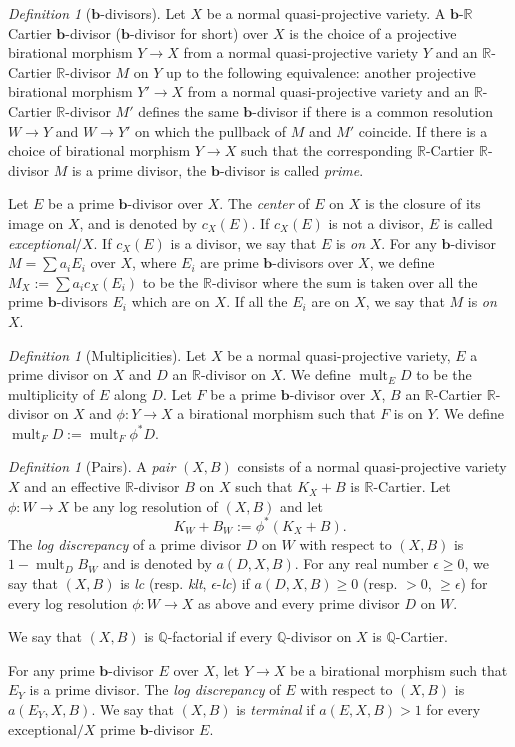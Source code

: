 \documentclass[11pt]{amsart}
\numberwithin{equation}{section}
\newcommand{\bb}{\bm{b}}
\newcommand{\Qq}{\mathbb{Q}}
\newcommand{\Rr}{\mathbb{R}}
\newcommand{\mult}{\operatorname{mult}}
\theoremstyle{definition}
\theoremstyle{remark}
\newtheorem{defn}[thm]{Definition}
\theoremstyle{definition}
\begin{document}
\begin{defn}[$\bb$-divisors] Let $X$ be a normal quasi-projective variety. A $\bb$-$\Rr$ Cartier $\bb$-divisor ($\bb$-divisor for short) over $X$ is the choice of a projective birational morphism $Y\to X$ from a normal quasi-projective variety $Y$ and an $\Rr$-Cartier $\mathbb R$-divisor $M$ on $Y$ up to the following equivalence: another projective birational morphism $Y'\to X$ from a normal quasi-projective variety and an $\Rr$-Cartier $\Rr$-divisor $M'$ defines the same $\bb$-divisor if there is a common resolution $W\to Y$ and $W\to Y'$ on which the pullback of $M$ and $M'$ coincide. If there is a choice of birational morphism $Y\rightarrow X$ such that the corresponding $\Rr$-Cartier $\Rr$-divisor $M$ is a prime divisor, the $\bb$-divisor is called \emph{prime}.

	Let $E$ be a prime $\bb$-divisor over $X$. The \emph{center} of $E$ on $X$ is the closure of its image on $X$, and is denoted by $c_X(E)$. If $c_X(E)$ is not a divisor, $E$ is called \emph{exceptional}$/X$. If $c_X(E)$ is a divisor, we say that $E$ is \emph{on} $X$. For any $\bb$-divisor $M=\sum a_iE_i$ over $X$, where $E_i$ are prime $\bb$-divisors over $X$, we define $M_X:=\sum a_ic_X(E_i)$ to be the $\Rr$-divisor where the sum is taken over all the prime $\bb$-divisors $E_i$ which are on $X$. If all the $E_i$ are on $X$, we say that $M$ is \emph{on} $X$. 
\end{defn}

\begin{defn}[Multiplicities] Let $X$ be a normal quasi-projective variety, $E$ a prime divisor on $X$ and $D$ an $\Rr$-divisor on $X$. We define $\mult_ED$ to be the multiplicity of $E$ along $D$. 
Let $F$ be a prime $\bb$-divisor over $X$, $B$ an $\Rr$-Cartier $\Rr$-divisor on $X$ and $\phi: Y\to X$ a birational morphism such that $F$ is on $Y$. We define $\mult_FD:=\mult_F\phi^*D$.
\end{defn}

\begin{defn}[Pairs]\label{defn: positivity}
	A \emph{pair} $(X,B)$ consists of a normal quasi-projective variety $X$ and an effective $\Rr$-divisor $B$ on $X$ such that $K_X+B$ is $\Rr$-Cartier.
	Let $\phi:W\to X$
	be any log resolution of $(X,B)$ and let
	$$K_W+B_W:=\phi^{*}(K_X+B).$$
	The \emph{log discrepancy} of a prime divisor $D$ on $W$ with respect to $(X,B)$ is $1-\mult_{D}B_W$ and is denoted by $a(D,X,B).$
	For any real number $\epsilon\geq 0$, we say that $(X,B)$ is \emph{lc} (resp. \emph{klt}, $\epsilon$-\emph{lc}) if $a(D,X,B)\ge0$ (resp. $>0$, $\ge\epsilon$) for every log resolution $\phi:W\to X$ as above and every prime divisor $D$ on $W$. 
	
	We say that $(X,B)$ is $\Qq$-factorial if every $\Qq$-divisor on $X$ is $\Qq$-Cartier. 
	
	For any prime $\bb$-divisor $E$ over $X$, let $Y\rightarrow X$ be a birational morphism such that $E_Y$ is a prime divisor. The \emph{log discrepancy} of $E$ with respect to $(X,B)$ is $a(E_Y,X,B)$. We say that $(X,B)$ is \emph{terminal} if $a(E,X,B)>1$ for every exceptional$/X$ prime $\bb$-divisor $E$. 
\end{defn}
\end{document}
